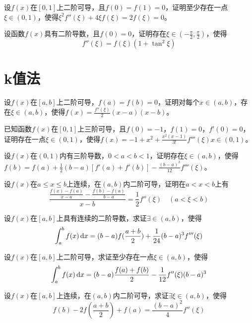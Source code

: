 \begin{example}
	设$f(x)$在$[0,1]$上二阶可导，且$f(0)=f(1)=0$，证明至少存在一点$\xi\in(0,1)$，使得$\xi^2f''(\xi)+4\xi f(\xi)=2f(\xi)=0$。
\end{example}

\begin{example}
	设函数$f(x)$具有二阶导数，且$f(0)=0$，证明存在$\xi\in\left(-\frac{\pi}{2},\frac{\pi}{2}\right)$，使得\[f''(\xi)=f(\xi)(1+\tan^2\xi)\]
\end{example}

\section{k值法}

\begin{example}
	设$f(x)$在$[a,b]$上二阶可导，$f(a)=f(b)=0$，证明对每个$x\in(a,b)$，存在$\xi\in(a,b)$，使得$f(x)=\frac{f''(\xi)}{2}(x-a)(x-b)$。
\end{example}

\begin{example}
	已知函数$f(x)$在$[0,1]$上三阶可导，且$f(0)=-1$，$f(1)=0$，$f'(0)=0$，证明存在一点$\xi\in(0,1)$，使得$f(x)=-1+x^2+\frac{x^2(x-1)}{3!}f'''(\xi)x\in(0,1)$。
\end{example}

\begin{example}
	设$f(x)$在$(0,1)$内有三阶导数，$0<a<b<1$，证明存在$\xi\in(a,b)$，使得$f(b)=f(a)+\frac{1}{2}(b-a)[f'(a)+f'(b)]-\frac{(b-a)^3}{12}f'''(\xi)$。
\end{example}

\begin{example}
	设$f(x)$在$a\leqslant x\leqslant b$上连续，在$(a,b)$内二阶可导，证明在$a<x<b$上有\[\frac{\frac{f(x)-f(a)}{x-a}-\frac{f(b)-f(a)}{b-a}}{x-b}=\frac{1}{2}f''(\xi)\quad(a<\xi<b)\]
\end{example}

\begin{example}
	设$f(x)$在$[a,b]$上具有连续的二阶导数，求证$\exists\in(a,b)$，使得\[\int_{a}^{b}f(x)\,\mathrm{d} x=(b-a)f(\frac{a+b}{2})+\frac{1}{24}(b-a)^3f'''(\xi)\]
\end{example}

\begin{example}
	设$f(x)$在$[a,b]$上二阶可导，求证至少存在一点$\xi\in(a,b)$，使得\[\int_{a}^{b}f(x)\,\mathrm{d} x=(b-a)\frac{f(a)+f(b)}{2}-\frac{1}{12}f''(\xi)(b-a)^3\]
\end{example}

\begin{example}
	设$f(x)$在$[a,b]$上连续，在$(a,b)$内二阶可导，求证$\exists\xi\in(a,b)$，使得\[f(b)-2f(\frac{a+b}{2})+f(a)=\frac{(b-a)^2}{4}f''(\xi)\]
\end{example}

